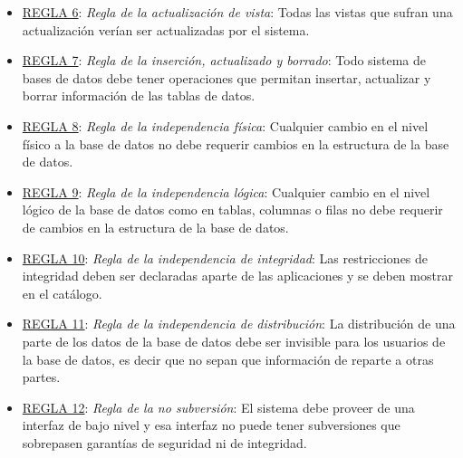 \documentclass[12pt, letterpaper]{article}
\begin{document}
\begin{itemize}
    \item[]\underline{REGLA 6}:  \textit{Regla de la actualización de vista}: Todas las 
                          vistas que sufran una actualización verían ser 
                          actualizadas por el sistema. \vspace{.3cm}

    \item[]\underline{REGLA 7}:  \textit{Regla de la inserción, actualizado y borrado}: 
                          Todo sistema de bases de datos debe tener operaciones 
                          que permitan insertar, actualizar y borrar información 
                          de las tablas de datos. \vspace{.3cm}

    \item[]\underline{REGLA 8}:  \textit{Regla de la independencia física}: Cualquier 
                          cambio en el nivel físico a la base de datos no debe 
                          requerir cambios en la estructura de la base de datos.
                          \vspace{.3cm} 

    \item[]\underline{REGLA 9}:  \textit{Regla de la independencia lógica}: Cualquier 
                          cambio en el nivel lógico de la base de datos como en 
                          tablas, columnas o filas no debe requerir de cambios 
                          en la estructura de la base de datos. \vspace{.3cm}

    \item[]\underline{REGLA 10}:   \textit{Regla de la independencia de integridad}: 
                            Las restricciones de integridad deben ser declaradas 
                            aparte de las aplicaciones y se deben mostrar en el 
                            catálogo. \vspace{.3cm} 

    \item[]\underline{REGLA 11}:   \textit{Regla de la independencia de distribución}: 
                            La distribución de una parte de los datos de la base 
                            de datos debe ser invisible para los usuarios de la 
                            base de datos, es decir que no sepan que información 
                            de reparte a otras partes. \vspace{.3cm}

    \item[]\underline{REGLA 12}:   \textit{Regla de la no subversión}: El sistema debe 
                            proveer de una interfaz de bajo nivel y esa interfaz 
                            no puede tener subversiones que sobrepasen garantías 
                            de seguridad ni de integridad. \vspace{.3cm}

    \end{itemize}
\end{document}
